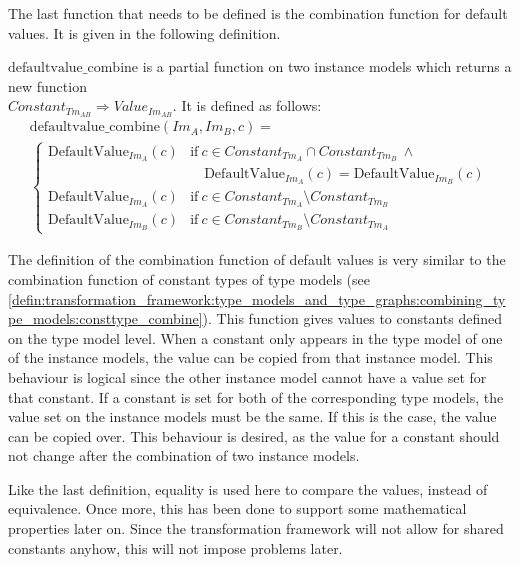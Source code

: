 The last function that needs to be defined is the combination function for default values. It is given in the following definition.

\begin{defin}
\label{defin:transformation_framework:instance_models_and_instance_graphs:combining_instance_models:defaultvalue_combine}
$\mathrm{defaultvalue\_\!combine}$ is a partial function on two instance models which returns a new function \\$Constant_{Tm_{AB}} \Rightarrow Value_{Im_{AB}}$. It is defined as follows:
\begin{multline*}
    \mathrm{defaultvalue\_\!combine}(Im_{A}, Im_{B}, c) = \\
    \begin{cases}
        \mathrm{DefaultValue}_{Im_A}(c) & \mathrm{if }\ c \in Constant_{Tm_A} \cap Constant_{Tm_B}\ \land\\&\quad \mathrm{DefaultValue}_{Im_A}(c) = \mathrm{DefaultValue}_{Im_B}(c) \\
        \mathrm{DefaultValue}_{Im_A}(c) & \mathrm{if }\ c \in Constant_{Tm_A} \setminus Constant_{Tm_B} \\
        \mathrm{DefaultValue}_{Im_B}(c) & \mathrm{if }\ c \in Constant_{Tm_B} \setminus Constant_{Tm_A}
    \end{cases}
\end{multline*}
\end{defin}

The definition of the combination function of default values is very similar to the combination function of constant types of type models (see \cref{defin:transformation_framework:type_models_and_type_graphs:combining_type_models:consttype_combine}). This function gives values to constants defined on the type model level. When a constant only appears in the type model of one of the instance models, the value can be copied from that instance model. This behaviour is logical since the other instance model cannot have a value set for that constant. If a constant is set for both of the corresponding type models, the value set on the instance models must be the same. If this is the case, the value can be copied over. This behaviour is desired, as the value for a constant should not change after the combination of two instance models.

Like the last definition, equality is used here to compare the values, instead of equivalence. Once more, this has been done to support some mathematical properties later on. Since the transformation framework will not allow for shared constants anyhow, this will not impose problems later.


